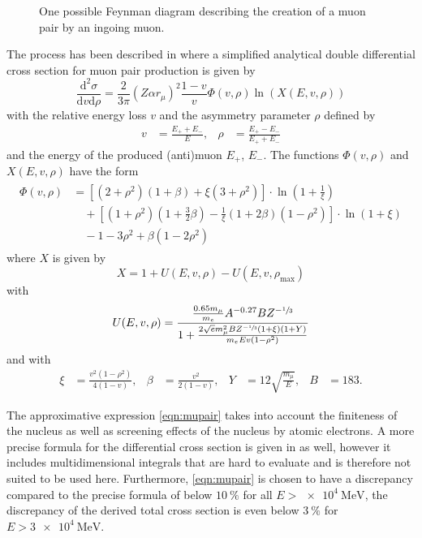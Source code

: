 \begin{figure}
	\centering
	
    \caption{One possible Feynman diagram describing the creation of a muon pair by an ingoing muon.}
    \label{fig:feynman_mupair}
\end{figure}

The process has been described in \cite{Kelner2000} where a simplified analytical double differential cross section for muon pair production is given by
\begin{equation}
    \label{eqn:mupair}
    \frac{\mathrm{d}^2\sigma}{\mathrm{d}v \mathrm{d}\rho} = \frac{2}{3\pi} (Z \alpha r_\mu)^2 \frac{1-v}{v} \Phi(v, \rho) \ln \left( X \left(E, v, \rho \right) \right)
\end{equation}
with the relative energy loss $v$ and the asymmetry parameter $\rho$ defined by
\begin{align}
    v &= \frac{E_+ + E_-}{E}, & \rho &= \frac{E_+ - E_-}{E_+ + E_-}
\end{align}
and the energy of the produced (anti)muon $E_+$, $E_-$.
The functions $\Phi(v, \rho)$ and $X(E, v, \rho)$ have the form
\begin{align}
    \begin{split}
    \Phi(v, \rho) &= \left[ (2 + \rho^2) (1 + \beta) + \xi (3 + \rho^2) \right] \cdot \ln{ \left( 1 + \frac{1}{\xi} \right) }\\ &\quad+ \left[ (1 + \rho^2) \left( 1 + \frac{3}{2} \beta \right) - \frac{1}{\xi} (1 + 2 \beta) (1 - \rho^2) \right] \cdot \ln{ (1 + \xi) }\\ &\quad- 1 - 3 \rho^2 + \beta (1 - 2 \rho^2)
    \end{split}
\end{align}
where $X$ is given by
\begin{equation}
    X = 1 + U(E, v, \rho) - U(E, v, \rho_\text{max})
\end{equation}
with 
\begin{equation}
    U(E, v, \rho) = \frac{\frac{0.65 m_{\mu}}{m_e} A^{-0.27} B Z^{-\sfrac{1}{3}}}{1 + \frac{2 \sqrt{e} m_{\mu}^2 B Z^{-\sfrac{1}{3}} (1 + \xi) (1 + Y) }{m_e E v (1 - \rho^2)} }
\end{equation}
and with 
\begin{align}
    \xi &= \frac{v^2 (1 - \rho^2)}{4 (1 - v)}, & \beta &= \frac{v^2}{2 (1 - v)}, & Y &= 12 \sqrt{\frac{m_{\mu}}{E}}, & B &= 183.
\end{align}

The approximative expression \eqref{eqn:mupair} takes into account the finiteness of the nucleus as well as screening effects of the nucleus by atomic electrons.
A more precise formula for the differential cross section is given in \cite{Kelner2000} as well, however it includes multidimensional integrals that are hard to evaluate and is therefore not suited to be used here.
Furthermore, \eqref{eqn:mupair} is chosen to have a discrepancy compared to the precise formula of below $\SI{10}{\percent}$ for all $E > \SI{e4}{\mega\electronvolt}$, the discrepancy of the derived total cross section is even below $\SI{3}{\percent}$ for $E > \SI{3e4}{\mega\electronvolt}$.

